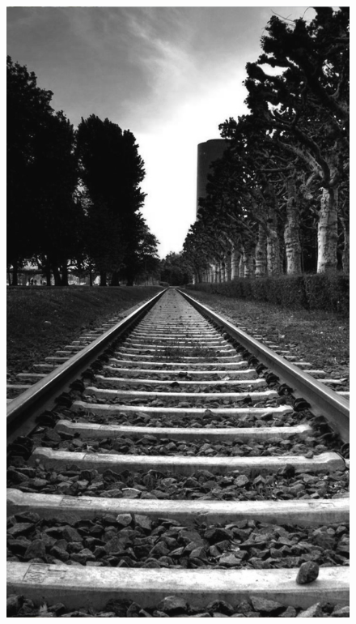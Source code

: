 \begin{figure}[ht]
\begin{minipage}{.24\textwidth}
        \includegraphics[width=.9\textwidth]{imgs/vias-gris.jpg}
    \end{minipage}
    \begin{minipage}{.24\textwidth}

\end{minipage}
\end{figure}
